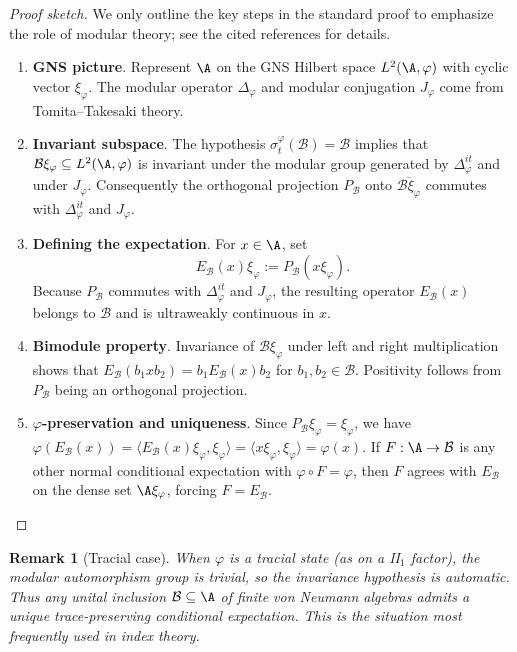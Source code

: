 \documentclass[11pt, a4paper]{article}
\theoremstyle{colored_def}
\theoremstyle{colored_thm}
\theoremstyle{colored_ex}
\newtheorem{remark}[example]{Remark}
\newcommand{\B}{\mathcal{B}}
\begin{document}
\begin{proof}[Proof sketch]
We only outline the key steps in the standard proof to emphasize the role of modular theory; see the cited references for details.
\begin{enumerate}
    \item \textbf{GNS picture}. Represent $\A$ on the GNS Hilbert space $L^2(\A, \varphi)$ with cyclic vector $\xi_\varphi$. The modular operator $\Delta_\varphi$ and modular conjugation $J_\varphi$ come from Tomita--Takesaki theory.
    \item \textbf{Invariant subspace}. The hypothesis $\sigma_t^\varphi(\B) = \B$ implies that $\B \xi_\varphi \subseteq L^2(\A, \varphi)$ is invariant under the modular group generated by $\Delta_\varphi^{it}$ and under $J_\varphi$. Consequently the orthogonal projection $P_{\B}$ onto $\overline{\B \xi_\varphi}$ commutes with $\Delta_\varphi^{it}$ and $J_\varphi$.
    \item \textbf{Defining the expectation}. For $x \in \A$, set
    $$
    E_{\B}(x) \xi_\varphi := P_{\B}(x \xi_\varphi).
    $$
    Because $P_{\B}$ commutes with $\Delta_\varphi^{it}$ and $J_\varphi$, the resulting operator $E_{\B}(x)$ belongs to $\B$ and is ultraweakly continuous in $x$.
    \item \textbf{Bimodule property}. Invariance of $\B \xi_\varphi$ under left and right multiplication shows that $E_{\B}(b_1 x b_2) = b_1 E_{\B}(x) b_2$ for $b_1, b_2 \in \B$. Positivity follows from $P_{\B}$ being an orthogonal projection.
    \item \textbf{$\varphi$-preservation and uniqueness}. Since $P_{\B} \xi_\varphi = \xi_\varphi$, we have $\varphi(E_{\B}(x)) = \langle E_{\B}(x) \xi_\varphi, \xi_\varphi \rangle = \langle x \xi_\varphi, \xi_\varphi \rangle = \varphi(x)$. If $F: \A \to \B$ is any other normal conditional expectation with $\varphi \circ F = \varphi$, then $F$ agrees with $E_{\B}$ on the dense set $\A \xi_\varphi$, forcing $F = E_{\B}$.
\end{enumerate}
\end{proof}

\begin{remark}[Tracial case]
When $\varphi$ is a tracial state (as on a II$_1$ factor), the modular automorphism group is trivial, so the invariance hypothesis is automatic. Thus any unital inclusion $\B \subseteq \A$ of finite von Neumann algebras admits a unique trace-preserving conditional expectation. This is the situation most frequently used in index theory. \cite{jones1983index, evanskawahigashi}
\end{remark}
\end{document}
